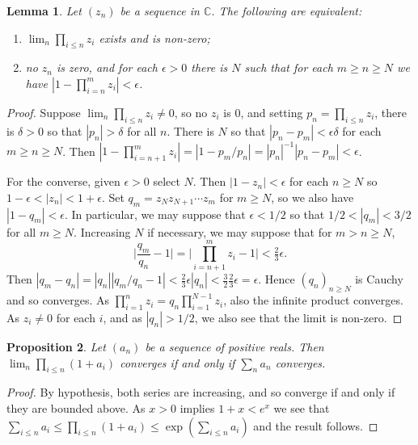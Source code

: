 \documentclass[twoside,a4paper,12pt]{article}
\theoremstyle{plain}
\newtheorem{proposition}{Proposition}[section]
\newtheorem{lemma}[proposition]{Lemma}
\theoremstyle{definition}
\begin{document}
\begin{lemma}\label{lem:cauchy_criterion}
Let $(z_n)$ be a sequence in $\mathbb C$.  The following are equivalent:
\begin{enumerate}
   \item $\lim_n \prod_{i\leq n}z_i$ exists and is non-zero;
   \item no $z_n$ is zero, and for each $\epsilon>0$ there is $N$ such that for each $m\geq n\geq N$ we have $| 1 - \prod_{i=n}^m z_i | < \epsilon$.
\end{enumerate}

\end{lemma}
\begin{proof}
Suppose $\lim_n \prod_{i\leq n}z_i\not=0$, so no $z_i$ is $0$, and setting $p_n = \prod_{i\leq n} z_i$, there is $\delta>0$ so that $|p_n| > \delta$ for all $n$.  There is $N$ so that $|p_n-p_m| < \epsilon\delta$ for each $m \geq n \geq N$.  Then $|1 - \prod_{i=n+1}^m z_i| = |1 - p_m/p_n| =|p_n|^{-1} |p_n-p_m| < \epsilon$.

For the converse, given $\epsilon>0$ select $N$.  Then $|1-z_n|<\epsilon$ for each $n\geq N$ so $1-\epsilon < |z_n| < 1+\epsilon$.  Set $q_m = z_N z_{N+1} \cdots z_m$ for $m\geq N$, so we also have $|1 - q_m| < \epsilon$.  In particular, we may suppose that $\epsilon < 1/2$ so that $1/2 < |q_m| < 3/2$ for all $m\geq N$.  Increasing $N$ if necessary, we may suppose that for $m > n \geq N$,
\[ \Big| \frac{q_m}{q_n} - 1 \Big| = \Big| \prod_{i=n+1}^m z_i - 1 \Big| < \tfrac{2}{3}\epsilon. \]
Then $|q_m - q_n| = |q_n| |q_m/q_n-1| < \frac23 \epsilon|q_n| < \frac32 \frac23 \epsilon = \epsilon$.  Hence $(q_n)_{n\geq N}$ is Cauchy and so converges.  As $\prod_{i=1}^n z_i = q_n \prod_{i=1}^{N-1}z_i$, also the infinite product converges.  As $z_i\not=0$ for each $i$, and as $|q_n| > 1/2$, we also see that the limit is non-zero.
\end{proof}

\begin{proposition}\label{prop:one_plus_inf_prod}
Let $(a_n)$ be a sequence of positive reals.  Then $\lim_n \prod_{i\leq n} (1+a_i)$ converges if and only if $\sum_n a_n$ converges.
\end{proposition}
\begin{proof}
By hypothesis, both series are increasing, and so converge if and only if they are bounded above.  As $x>0$ implies $1+x < e^x$ we see that $\sum_{i\leq n} a_i \leq \prod_{i\leq n} (1+a_i) \leq \exp(\sum_{i\leq n} a_i)$ and the result follows.
\end{proof}
\end{document}
